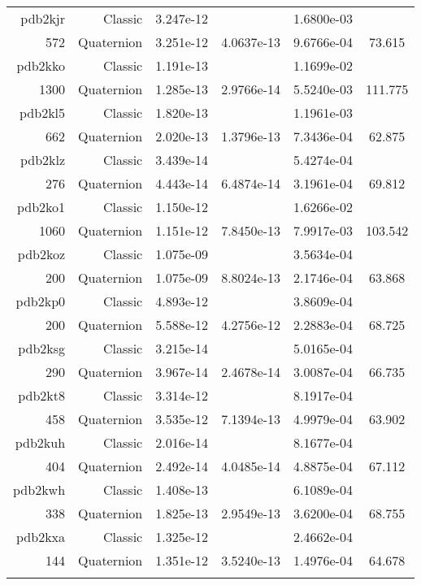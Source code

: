 \begin{xltabular}{\textwidth}{r|rS[table-format=1.3e+2]S[table-format=1.4e+2]S[table-format=1.4e+2]S[table-format=-1.3]}
pdb2kjr & Classic & 3.247e-12 &  & 1.6800e-03 & \\
572 & Quaternion & 3.251e-12 & 4.0637e-13 & 9.6766e-04 & 73.615\\  \addlinespace
pdb2kko & Classic & 1.191e-13 &  & 1.1699e-02 & \\
1300 & Quaternion & 1.285e-13 & 2.9766e-14 & 5.5240e-03 & 111.775\\  \addlinespace
pdb2kl5 & Classic & 1.820e-13 &  & 1.1961e-03 & \\
662 & Quaternion & 2.020e-13 & 1.3796e-13 & 7.3436e-04 & 62.875\\  \addlinespace
pdb2klz & Classic & 3.439e-14 &  & 5.4274e-04 & \\
276 & Quaternion & 4.443e-14 & 6.4874e-14 & 3.1961e-04 & 69.812\\  \addlinespace
pdb2ko1 & Classic & 1.150e-12 &  & 1.6266e-02 & \\
1060 & Quaternion & 1.151e-12 & 7.8450e-13 & 7.9917e-03 & 103.542\\  \addlinespace
pdb2koz & Classic & 1.075e-09 &  & 3.5634e-04 & \\
200 & Quaternion & 1.075e-09 & 8.8024e-13 & 2.1746e-04 & 63.868\\  \addlinespace
pdb2kp0 & Classic & 4.893e-12 &  & 3.8609e-04 & \\
200 & Quaternion & 5.588e-12 & 4.2756e-12 & 2.2883e-04 & 68.725\\  \addlinespace
pdb2ksg & Classic & 3.215e-14 &  & 5.0165e-04 & \\
290 & Quaternion & 3.967e-14 & 2.4678e-14 & 3.0087e-04 & 66.735\\  \addlinespace
pdb2kt8 & Classic & 3.314e-12 &  & 8.1917e-04 & \\
458 & Quaternion & 3.535e-12 & 7.1394e-13 & 4.9979e-04 & 63.902\\  \addlinespace
pdb2kuh & Classic & 2.016e-14 &  & 8.1677e-04 & \\
404 & Quaternion & 2.492e-14 & 4.0485e-14 & 4.8875e-04 & 67.112\\  \addlinespace
pdb2kwh & Classic & 1.408e-13 &  & 6.1089e-04 & \\
338 & Quaternion & 1.825e-13 & 2.9549e-13 & 3.6200e-04 & 68.755\\  \addlinespace
pdb2kxa & Classic & 1.325e-12 &  & 2.4662e-04 & \\
144 & Quaternion & 1.351e-12 & 3.5240e-13 & 1.4976e-04 & 64.678\\  \addlinespace

\end{xltabular}
